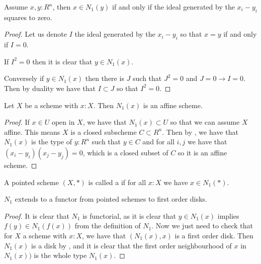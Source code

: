 \begin{lemma}\label{first-order-square-zero}
Assume $x,y:R^n$, then $x\in N_1(y)$ if and only if the ideal generated by the $x_i-y_i$ squares to zero.
\end{lemma}

\begin{proof}
Let us denote $I$ the ideal generated by the $x_i-y_i$ so that $x=y$ if and only if $I=0$. 

If $I^2=0$ then it is clear that $y\in N_1(x)$.

Conversely if $y\in N_1(x)$ then there is $J$ such that $J^2=0$ and $J=0 \to I=0$. Then by duality we have that $I\subset J$ so that $I^2=0$.
\end{proof}

\begin{lemma}\label{first-order-schemes}
Let $X$ be a scheme with $x:X$. Then $N_1(x)$ is an affine scheme. 
\end{lemma}

\begin{proof}
If $x\in U$ open in $X$, we have that $N_1(x)\subset U$ so that we can assume $X$ affine. This means $X$ is a closed subscheme $C\subset R^n$. Then by , we have that $N_1(x)$ is the type of $y:R^n$ such that $y\in C$ and for all $i,j$ we have that $(x_i-y_i)(x_j-y_j) = 0$, which is a closed subset of $C$ so it is an affine scheme.
\end{proof}

\begin{definition}
A pointed scheme $(X,*)$ is called a  if for all $x:X$ we have $x\in N_1(*)$.
\end{definition}

\begin{lemma}
  \label{N1-functor}
  $N_1$ extends to a functor from pointed schemes to first order disks.
\end{lemma}

\begin{proof}
It is clear that $N_1$ is functorial, as it is clear that $y\in N_1(x)$ implies $f(y)\in N_1(f(x))$ from the definition of $N_1$. Now we just need to check that for $X$ a scheme with $x:X$, we have that $(N_1(x),x)$ is a first order disk. Then $N_1(x)$ is a disk by , and it is clear that the first order neighbourhood of $x$ in $N_1(x))$ is the whole type $N_1(x)$.
\end{proof}

